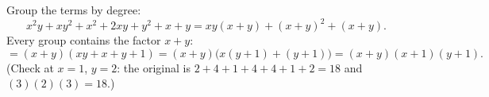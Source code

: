 Group the terms by degree:
\[x^2y+xy^2+x^2+2xy+y^2+x+y=xy(x+y)+(x+y)^2+(x+y).\]
Every group contains the factor $x+y$:
\[=(x+y)(xy+x+y+1)=(x+y)\bigl(x(y+1)+(y+1)\bigr)=\boxed{(x+y)(x+1)(y+1)}.\]
(Check at $x=1$, $y=2$: the original is $2+4+1+4+4+1+2=18$ and $(3)(2)(3)=18$.)
